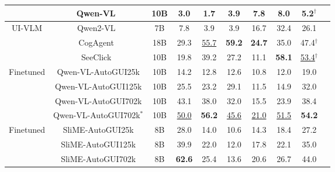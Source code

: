 \begin{table}[]
\begin{tabular}{@{}cccccccccc@{}}
 & Qwen-VL~\citep{bai2023qwen} & 10B &  3.0     &      1.7          &      3.9          &    7.8 &  8.0  & 5.2$^{\dag}$   \\ 
 \midrule
\multirow{3}{*}{UI-VLM} &  Qwen2-VL~\citep{bai2023qwen}  & 7B     &     7.8       &    3.9        &  3.9  &  16.7 & 32.4 & 26.1    \\
 & CogAgent~\citep{hong2023cogagent} & 18B    &  29.3   &    \underline{55.7}      &    \textbf{59.2}      & \textbf{24.7}   & 35.0 &  47.4$^{\dag}$  \\
 & SeeClick~\citep{cheng2024seeclick} & 10B    &    19.8     &    39.2           &     27.2           & 11.1  &  \textbf{58.1}  & \underline{53.4}$^{\dag}$ \\ 
\midrule
\multirow{4}{*}{Finetuned} &  Qwen-VL-AutoGUI25k & 10B      &    14.2     &      12.8         &    12.6           &   10.8    &  12.0 & 19.0    \\
 & Qwen-VL-AutoGUI125k  & 10B       &     25.5     &      23.2         &        29.1       &    11.5   &  14.9 & 32.0     \\ 
 & Qwen-VL-AutoGUI702k  & 10B       &   43.1   &    38.0       &     32.0    &  15.5  & 23.9 &    38.4   \\
& Qwen-VL-AutoGUI702k$^*$   & 10B     &  \underline{50.0}  &    \textbf{56.2}    &  \underline{45.6}  & \underline{21.0} & \underline{51.5} & \textbf{54.2}      \\
\midrule
\multirow{3}{*}{Finetuned} & SliME-AutoGUI25k  & 8B     &   28.0   &     14.0      &      10.6      &  14.3   & 18.4 & 27.2   \\
 & SliME-AutoGUI125k   & 8B      &   39.9    &  22.0   &     12.0       &  17.8  & 22.1 &  35.0     \\
 & SliME-AutoGUI702k   & 8B      &     \textbf{62.6}   &       25.4        &     13.6          &   20.6    & 26.7 & 44.0 &          \\
\bottomrule
\end{tabular}
\end{table}
\vspace{-2mm}
